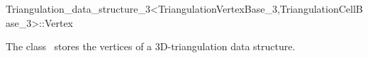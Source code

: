 

\begin{ccRefClass}{Triangulation_data_structure_3<TriangulationVertexBase_3,TriangulationCellBase_3>::Vertex}  %


\ccDefinition
  
The class \ccRefName\ stores the vertices of a 3D-triangulation data structure. 


\ccIsModel


\ccSeeAlso




\end{ccRefClass}


